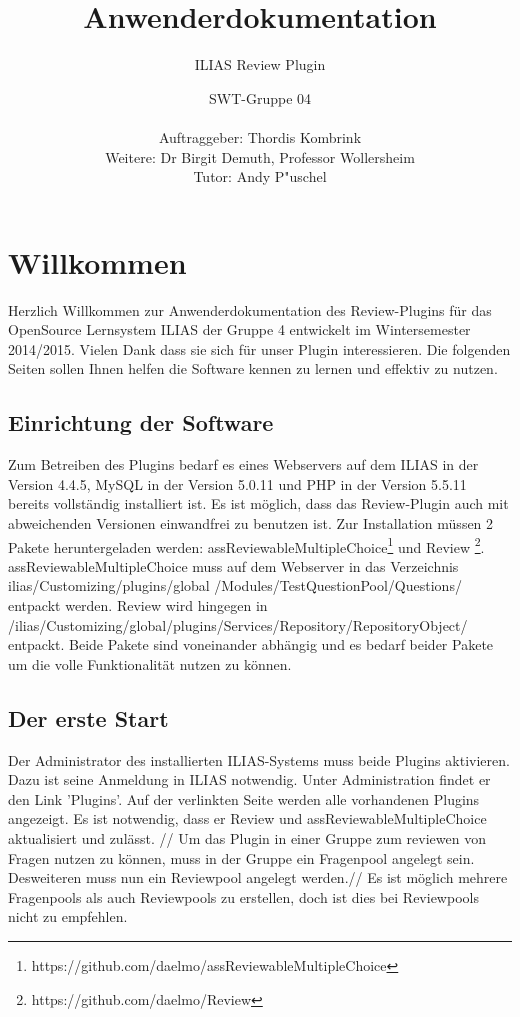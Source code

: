 \documentclass[12pt,a4paper]{scrreprt}
\begin{document}
\title{Anwenderdokumentation}
\subtitle{ILIAS Review Plugin}
\publishers{Version: 5.0, Status: Fertiggestellt}
\author{SWT-Gruppe 04\\ \\Auftraggeber: Thordis Kombrink\\Weitere: Dr Birgit Demuth, Professor Wollersheim\\Tutor: Andy P"uschel}
\maketitle
\tableofcontents

\chapter{Willkommen}
Herzlich Willkommen zur Anwenderdokumentation des Review-Plugins für das OpenSource Lernsystem ILIAS der Gruppe 4 entwickelt im Wintersemester 2014/2015. Vielen Dank dass sie sich für unser Plugin interessieren. Die folgenden Seiten sollen Ihnen helfen die Software kennen zu lernen und effektiv zu nutzen. 
	\section{Einrichtung der Software}
	Zum Betreiben des Plugins bedarf es eines Webservers auf dem ILIAS in der Version 4.4.5, MySQL in der Version 5.0.11 und PHP in der Version 5.5.11 bereits vollständig installiert ist. Es ist möglich, dass das Review-Plugin auch mit abweichenden Versionen einwandfrei zu benutzen ist.
Zur Installation müssen 2 Pakete heruntergeladen werden: assReviewableMultipleChoice\footnote{\label{foot:1}https://github.com/daelmo/assReviewableMultipleChoice}	und Review
\footnote{\label{foot:2}https://github.com/daelmo/Review}. 
	assReviewableMultipleChoice muss auf dem Webserver in das Verzeichnis ilias/Customizing/plugins/global /Modules/TestQuestionPool/Questions/ entpackt werden. Review wird hingegen in /ilias/Customizing/global/plugins/Services/Repository/RepositoryObject/ entpackt.
	Beide Pakete sind voneinander abhängig und es bedarf beider Pakete um die volle Funktionalität nutzen zu können.
	\section{Der erste Start}
	Der Administrator des installierten ILIAS-Systems muss beide Plugins aktivieren. Dazu ist seine Anmeldung in ILIAS notwendig. Unter Administration findet er den Link 'Plugins'. Auf der verlinkten Seite werden alle vorhandenen Plugins angezeigt. Es ist notwendig, dass er Review und assReviewableMultipleChoice aktualisiert und zulässt. //
	Um das Plugin in einer Gruppe zum reviewen von Fragen nutzen zu können, muss in der Gruppe ein Fragenpool angelegt sein. Desweiteren muss nun ein Reviewpool angelegt werden.//
	Es ist möglich mehrere Fragenpools als auch Reviewpools zu erstellen, doch ist dies bei Reviewpools nicht zu empfehlen. 
\end{document}
